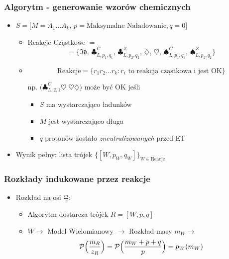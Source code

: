 \documentclass[xetex]{beamer}
\begin{document}
	\begin{frame}\frametitle{Algorytm - generowanie wzorów chemicznych}

		\begin{itemize}
			\item $S = \Big[M = A_1 \dots A_k,\, p = \text{Maksymalne Naładowanie}, q = 0\Big]$

			\begin{itemize}
			
				\item Reakcje Cząstkowe $ = $ 
					$$ = \{ 
					\mathfrak{Id},\,
					\clubsuit^C_{L , p_1, q_1},\,
					\clubsuit^Z_{L,p_2, q_2},\, 
					\diamondsuit,\, 
					\heartsuit,\, 
					\spadesuit^C_{L,\tilde{p}_1, \tilde{q}_1},\, 
					\spadesuit^Z_{L,\tilde{p}_2, \tilde{q}_2} \} $$
				\item  
					$$ \text{Reakcje}= \{ r_1 r_2 \dots r_k : r_i \text{ to reakcja cząstkowa i jest OK} \} $$
				\item[np.] $\Big(\clubsuit^C_{L, 2,1} \heartsuit$ $\heartsuit \diamondsuit\Big)$ może być OK jeśli 

				\begin{itemize}
					\item $S$ ma wystarczająco ładunków
					\item $M$ jest wystarczająco długa
					\item $q$ protonów zostało {\it zneutralizowanych} przed ET 
				\end{itemize}
			
			\end{itemize}

			\item 	Wynik pełny: lista trójek $\Biggl\{[W, p_W, q_W]\Biggl\}_{W \in \text{Reacje}}$  
		\end{itemize}
	\end{frame}

	
	\begin{frame}\frametitle{Rozkłady indukowane przez reakcje}
		\begin{itemize}
			\item Rozkład na osi $\frac{m}{z}$: 
	
			\begin{itemize}
				\item 	Algorytm dostarcza trójek $R = [ W, p, q]$ 
				\item 	$W \rightarrow$ Model Wielomianowy $\rightarrow$ Rozkład masy $m_W \rightarrow$ 
					$$ \mathcal{P}\Big(\frac{m_R}{z_R}\Big)  = \mathcal{P}\Big(\frac{m_W + p + q}{p}\Big) = p_W (m_W)$$
			\end{itemize}
		\end{itemize}
	\end{frame}
\end{document}
